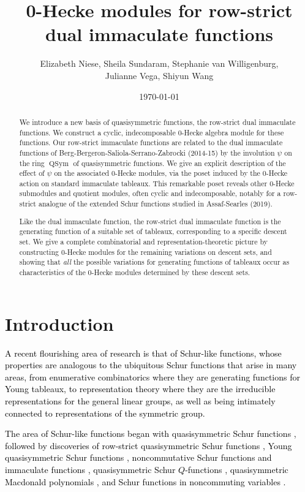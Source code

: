 \documentclass[12pt,letterpaper]{amsart}
\author[Niese, Sundaram, van Willigenburg, Vega, Wang]{Elizabeth Niese, Sheila Sundaram, Stephanie van Willigenburg,\\ Julianne Vega, Shiyun Wang}
\title[Row-strict 0-Hecke algebra modules]{0-Hecke modules for row-strict dual immaculate functions}
\date{\today}
\newcommand{\svw}{\textcolor{black}}
\newcommand{\sheila}{\textcolor{black}}
\theoremstyle{definition}
\newcommand{\Qsym}{\ensuremath{\operatorname{QSym}}}
\begin{document}
\subjclass{\svw{05E05, 05E10, 06A07, 16T05, 20C08.}}
\keywords{\svw{Quasisymmetric functions, dual immaculate functions, 0-Hecke algebra, indecomposable module.}}

\begin{abstract}{We introduce a new basis of quasisymmetric functions, the row-strict dual immaculate functions.  We construct a cyclic, indecomposable 0-Hecke algebra module for these functions.   Our row-strict immaculate functions are related to the dual immaculate functions of Berg-Bergeron-Saliola-Serrano-Zabrocki (2014-15) by the involution $\psi$ on the ring $\Qsym$ of quasisymmetric functions.  We give an explicit description of the effect of $\psi$ on the associated 0-Hecke modules, via the poset induced by the 0-Hecke action on standard immaculate tableaux.  This remarkable poset reveals other 0-Hecke submodules and quotient modules, often cyclic and indecomposable, notably for a row-strict analogue of the extended Schur functions studied in Assaf-Searles (2019). 

Like the dual immaculate function, the  row-strict dual immaculate function is the generating function of a suitable set of tableaux, corresponding to a specific  descent set. We give a complete combinatorial and representation-theoretic picture by constructing 0-Hecke modules for the remaining variations on descent sets,  and showing that \emph{all} the possible variations for generating functions of tableaux occur as characteristics of the 0-Hecke modules determined by these descent sets. }
\end{abstract}
\maketitle
\tableofcontents
\section{Introduction}\label{sec:Intro}
\svw{A recent flourishing area of research is that of Schur-like functions, whose properties are analogous to the ubiquitous Schur functions that arise in many areas, from enumerative combinatorics where they are generating functions for Young tableaux, to representation theory where they are the irreducible representations for the general linear groups, \sheila{as well as being intimately connected to representations of the symmetric group}.}

\svw{The area of Schur-like functions began with quasisymmetric Schur functions \cite{HLMvW2011},  followed by discoveries of row-strict quasisymmetric Schur functions \cite{MR2014}, Young quasisymmetric Schur functions \cite{LMvW2013, MN2015}, noncommutative Schur functions \cite{BLvW2011} and immaculate functions \cite{BBSSZ2014},  quasisymmetric Schur $Q$-functions \cite{JL2015},   quasisymmetric Macdonald polynomials \cite{CHMMW2022}, and Schur functions in noncommuting variables \cite{ALvW2021}.}
\end{document}
